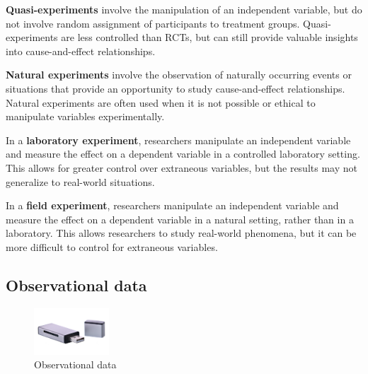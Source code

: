 \documentclass[
  12pt,
  oneside]{book}
\theoremstyle{definition}
\theoremstyle{definition}
\theoremstyle{definition}
\theoremstyle{definition}
\theoremstyle{remark}
\begin{document}
\textbf{Quasi-experiments} involve the manipulation of an independent variable, but do not involve random assignment of participants to treatment groups. Quasi-experiments are less controlled than RCTs, but can still provide valuable insights into cause-and-effect relationships.

\textbf{Natural experiments} involve the observation of naturally occurring events or situations that provide an opportunity to study cause-and-effect relationships. Natural experiments are often used when it is not possible or ethical to manipulate variables experimentally.

In a \textbf{laboratory experiment}, researchers manipulate an independent variable and measure the effect on a dependent variable in a controlled laboratory setting. This allows for greater control over extraneous variables, but the results may not generalize to real-world situations.

In a \textbf{field experiment}, researchers manipulate an independent variable and measure the effect on a dependent variable in a natural setting, rather than in a laboratory. This allows researchers to study real-world phenomena, but it can be more difficult to control for extraneous variables.

\hypertarget{observational-data}{%
\subsection{Observational data}\label{observational-data}}

\begin{figure}
\centering
\includegraphics[width=0.25\textwidth,height=\textheight]{fig/usb.jpg}
\caption[\label{fig:observationaldata} Observational data]{\label{fig:observationaldata} Observational data\footnotemark{}}
\end{figure}
\end{document}
